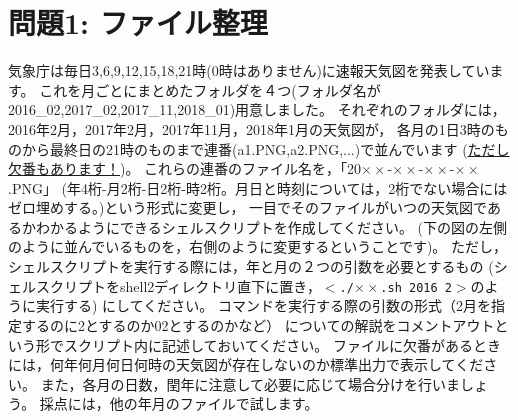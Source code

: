 \documentclass[a4j]{ltjreport}
\begin{document}
    \section*{問題1: ファイル整理}
    気象庁は毎日3,6,9,12,15,18,21時(0時はありません)に速報天気図を発表しています。
    これを月ごとにまとめたフォルダを４つ(フォルダ名が2016\_02,2017\_02,2017\_11,2018\_01)用意しました。
    それぞれのフォルダには，2016年2月，2017年2月，2017年11月，2018年1月の天気図が，
    各月の1日3時のものから最終日の21時のものまで連番(a1.PNG,a2.PNG,...)で並んでいます
    (\underline{ただし欠番もあります！})。
    これらの連番のファイル名を，「20$\times\times$-$\times\times$-$\times\times$-$\times\times$.PNG」
    (年4桁-月2桁-日2桁-時2桁。月日と時刻については，2桁でない場合にはゼロ埋めする。)という形式に変更し，
    一目でそのファイルがいつの天気図であるかわかるようにできるシェルスクリプトを作成してください。
    (下の図の左側のように並んでいるものを，右側のように変更するということです)。
    ただし，シェルスクリプトを実行する際には，年と月の２つの引数を必要とするもの
    (シェルスクリプトをshell2ディレクトリ直下に置き，$<$\texttt{./$\times\times$.sh 2016 2}$>$のように実行する)
    にしてください。
    コマンドを実行する際の引数の形式（2月を指定するのに2とするのか02とするのかなど）
    についての解説をコメントアウトという形でスクリプト内に記述しておいてください。
    ファイルに欠番があるときには，何年何月何日何時の天気図が存在しないのか標準出力で表示してください。
    また，各月の日数，閏年に注意して必要に応じて場合分けを行いましょう。
    採点には，他の年月のファイルで試します。
\end{document}
